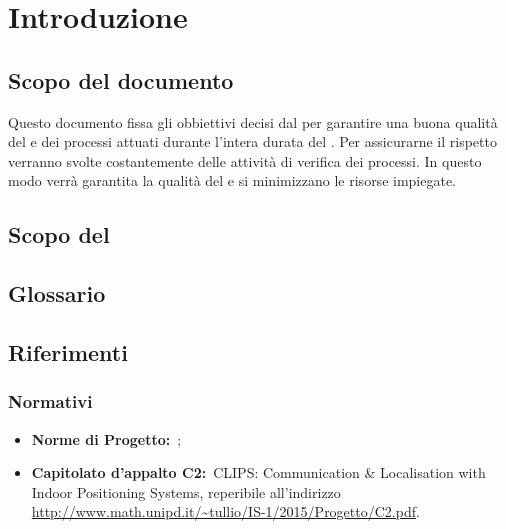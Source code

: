 
\section{Introduzione}
\label{introduzione}
	\subsection{Scopo del documento}
	\label{scopo del documento}
	Questo documento fissa gli obbiettivi decisi dal  per garantire una buona qualità del  e dei processi attuati durante l'intera durata del . Per assicurarne il rispetto verranno svolte costantemente delle attività di verifica dei processi. In questo modo verrà garantita la qualità del  e si minimizzano le risorse impiegate.
	
	\subsection{Scopo del }
	\label{scopo del prodotto}
	\SCOPO
	
	\subsection{Glossario}
	\label{glossario}
	\GLOSSARIO
	
	\subsection{Riferimenti}
	\label{riferimenti}
		\subsubsection{Normativi}
		\label{normativi}
			\begin{itemize}
				\item \textbf{Norme di Progetto:}\ \NPdoc;
				\item \textbf{Capitolato d'appalto C2:}\ CLIPS: Communication \& Localisation with Indoor Positioning Systems, reperibile all'indirizzo \url{http://www.math.unipd.it/~tullio/IS-1/2015/Progetto/C2.pdf}.
			\end{itemize}
	
